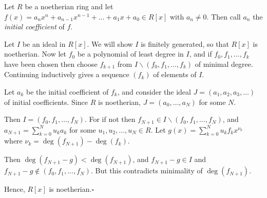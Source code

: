 \documentclass[12pt]{article}
\begin{document}
Let $R$ be a noetherian ring and let $f(x) = a_n x^n + a_{n-1}
x^{n-1} + \ldots + a_1 x + a_0 \in R[x]$ with $a_n\neq 0$. Then
call $a_n$ the \emph{initial coefficient} of $f$.

Let $I$ be an ideal in $R[x]$.  We will show $I$ is finitely
generated, so that $R[x]$ is noetherian.  Now let $f_0$ be a
polynomial of least degree in $I$, and if $f_0, f_1, \ldots , f_k$
have been chosen then choose $f_{k+1}$ from $I\smallsetminus (f_0,
f_1, \ldots , f_k)$ of minimal degree.  Continuing inductively
gives a sequence $(f_k)$ of elements of $I$.

Let $a_k$ be the initial coefficient of $f_k$, and
consider the ideal $J=(a_1, a_2, a_3, \ldots )$ of initial
coefficients. Since $R$ is noetherian, $J=(a_0, \ldots , a_N)$ for
some $N$.

Then $I=(f_0, f_1, \ldots , f_N)$.  For if not then
$f_{N+1}\in I\smallsetminus (f_0, f_1, \ldots , f_N)$, and
$a_{N+1} = \sum_{k=0}^N u_k a_k$ for some $u_1, u_2, \ldots ,
u_N\in R$. Let $g(x)=\sum_{k=0}^N u_k f_k x^{\nu_k}$ where $\nu_k
= \operatorname{deg}(f_{N+1})-\operatorname{deg}(f_k)$.

Then $\operatorname{deg}(f_{N+1} - g) <
\operatorname{deg}(f_{N+1})$, and $f_{N+1} - g \in I$ and
$f_{N+1}-g\notin (f_0, f_1, \ldots , f_N)$.  But this contradicts
minimality of $\operatorname{deg}(f_{N+1})$.

Hence, $R[x]$ is noetherian.$\square$
\end{document}
